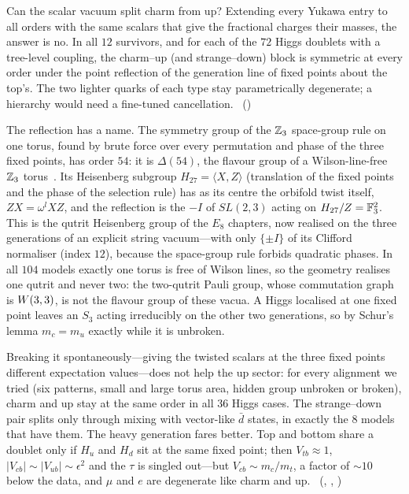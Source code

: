 Can the scalar vacuum split charm from up? Extending every Yukawa entry to all orders with the same scalars that
give the fractional charges their masses, the answer is no. In all $12$ survivors, and for each of the $72$ Higgs
doublets with a tree-level coupling, the charm--up (and strange--down) block is symmetric at every order under the
point reflection of the generation line of fixed points about the top's. The two lighter quarks of each type stay
parametrically degenerate; a hierarchy would need a fine-tuned cancellation. \tierC\
()

The reflection has a name. The symmetry group of the $\mathbb{Z}_3$ space-group rule on one torus, found by brute force over
every permutation and phase of the three fixed points, has order $54$: it is $\Delta(54)$, the flavour group of a
Wilson-line-free $\mathbb{Z}_3$ torus~\cite{KNPRR2007}. Its Heisenberg subgroup $H_{27}=\langle X,Z\rangle$ (translation of the
fixed points and the phase of the selection rule) has as its centre the orbifold twist itself, $ZX=\omega^{l}XZ$, and
the reflection is the $-I$ of $SL(2,3)$ acting on $H_{27}/Z=\mathbb{F}_3^2$. This is the qutrit Heisenberg group of the
$E_8$ chapters, now realised on the three generations of an explicit string vacuum---with only $\{\pm I\}$ of its
Clifford normaliser (index $12$), because the space-group rule forbids quadratic phases. In all $104$ models exactly
one torus is free of Wilson lines, so the geometry realises one qutrit and never two: the two-qutrit Pauli group,
whose commutation graph is $W(3,3)$, is not the flavour group of these vacua. A Higgs localised at one fixed point leaves
an $S_3$ acting irreducibly on the other two generations, so by Schur's lemma $m_c=m_u$ exactly while it is unbroken.

Breaking it spontaneously---giving the twisted scalars at the three fixed points different expectation values---does
not help the up sector: for every alignment we tried (six patterns, small and large torus area, hidden group
unbroken or broken), charm and up stay at the same order in all $36$ Higgs cases. The strange--down pair splits only
through mixing with vector-like $\bar d$ states, in exactly the $8$ models that have them. The heavy generation fares
better. Top and bottom share a doublet only if $H_u$ and $H_d$ sit at the same fixed point; then $V_{tb}\approx1$,
$|V_{cb}|\sim|V_{ub}|\sim\epsilon^2$ and the $\tau$ is singled out---but $V_{cb}\sim m_c/m_t$, a factor of $\sim10$
below the data, and $\mu$ and $e$ are degenerate like charm and up. \tierC\
(, ,
\cert{w33\_pass11105\_delta54\_flavour\_join.py})

